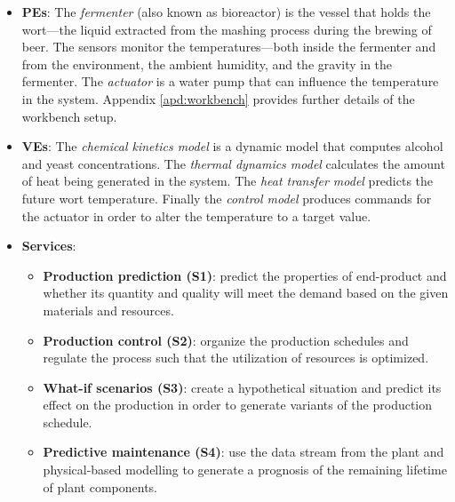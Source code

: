 \begin{itemize}
  \item \textbf{PEs}: The \textit{fermenter} (also known as bioreactor) is the vessel that holds the wort---the liquid extracted from the mashing process during the brewing of beer. The sensors monitor the temperatures---both inside the fermenter and from the environment, the ambient humidity, and the gravity in the fermenter. The \textit{actuator} is a water pump that can influence the temperature in the system. Appendix \ref{apd:workbench} provides further details of the workbench setup.

  \item \textbf{VEs}: The \textit{chemical kinetics model} is a dynamic model that computes alcohol and yeast concentrations. The \textit{thermal dynamics model} calculates the amount of heat being generated in the system. The \textit{heat transfer model} predicts the future wort temperature. Finally the \textit{control model} produces commands for the actuator in order to alter the temperature to a target value.
  
  \item \textbf{Services}:
  	\begin{itemize}
  	\item \textbf{Production prediction (S1)}: predict the properties of end-product and whether its quantity and quality will meet the demand based on the given materials and resources. 

  	\item \textbf{Production control (S2)}: organize the production schedules and regulate the process such that the utilization of resources is optimized.
  	
  	\item \textbf{What-if scenarios (S3)}: create a hypothetical situation and predict its effect on the production in order to generate variants of the production schedule.
  	
\item \textbf{Predictive maintenance (S4)}: use the data stream from the plant and physical-based modelling to generate a prognosis of the remaining lifetime of plant components.
	\end{itemize}
	

\end{itemize}
